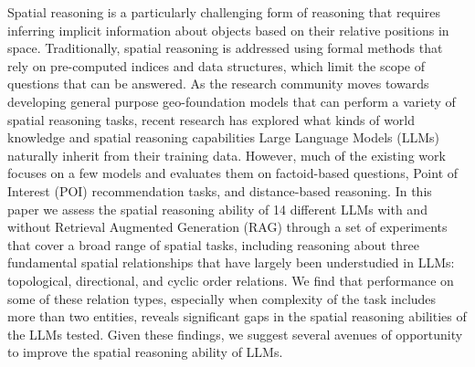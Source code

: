 
Spatial reasoning is a particularly challenging form of reasoning that requires inferring implicit information about objects based on their relative positions in space.
Traditionally, spatial reasoning is addressed using formal methods that rely on pre-computed indices and data structures, which limit the scope of questions that can be answered.
As the research community moves towards developing general purpose geo-foundation models that can perform a variety of spatial reasoning tasks, recent research has explored what kinds of world knowledge and spatial reasoning capabilities Large Language Models (LLMs) naturally inherit from their training data.
However, much of the existing work focuses on a few models and evaluates them on factoid-based questions, Point of Interest (POI) recommendation tasks, and distance-based reasoning.
In this paper we assess the spatial reasoning ability of 14 different LLMs with and without Retrieval Augmented Generation (RAG) through a set of experiments that cover a broad range of spatial tasks, including reasoning about three fundamental spatial relationships that have largely been understudied in LLMs: topological, directional, and cyclic order relations.
We find that performance on some of these relation types, especially when complexity of the task includes more than two entities, reveals significant gaps in the spatial reasoning abilities of the LLMs tested. 
Given these findings, we suggest several avenues of opportunity to improve the spatial reasoning ability of LLMs.
